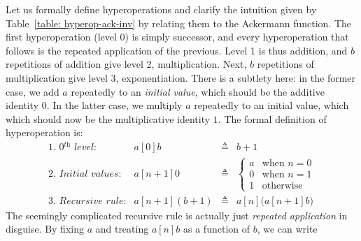 Let us formally define hyperoperations and clarify the intuition
given by Table~\ref{table: hyperop-ack-inv} by relating them to
the Ackermann function.
The first hyperoperation (level 0) is simply successor, and
every hyperoperation that follows is the repeated application of the previous.
Level 1 is thus addition, and $b$ repetitions of addition
give level 2, multiplication. Next, $b$ repetitions of
multiplication give level 3, exponentiation.
There is a subtlety here: in the former case, we add $a$
repeatedly to an \emph{initial value}, which should be the additive identity $0$.
In the latter case, we multiply $a$ repeatedly to an initial value, which
which should now be the multiplicative identity $1$. The formal definition of hyperoperation is:
\begin{equation}
\label{eq:hyper}
\begin{array}{lrcl}
\textit{1. 0$^{\textit{th}}$ level:} & a[0]b & \triangleq & b + 1 \\
\textit{2. Initial values:} & a[n+1]0 & \triangleq &
  \begin{cases}
    a & \text{when } n = 0 \\
    0 & \text{when } n = 1 \\
    1 & \text{otherwise}
  \end{cases} \\
\textit{3. Recursive rule:} & a[n+1](b+1) & \triangleq & a[n]\big(a[n+1]b\big)
\end{array}
\end{equation}
The seemingly complicated recursive rule is actually just \emph{repeated application} in disguise. By fixing $a$ and treating $a[n]b$ as a function of $b$, we can write
